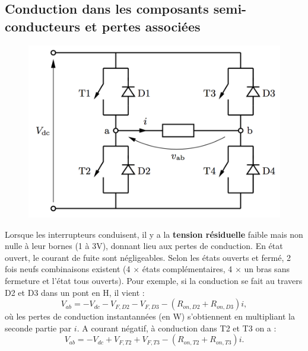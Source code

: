 	\subsection{Conduction dans les composants semi-conducteurs et pertes associées}
		\begin{figure}
		\vspace{-5mm}
		\includegraphics[scale=0.3]{ch4/9}
		\end{figure}
		Lorsque les interrupteurs conduisent, il y a la \textbf{tension résiduelle} faible mais non nulle à leur bornes (1 à 3V), donnant lieu aux pertes de conduction. En état ouvert, le courant de fuite sont négligeables. Selon les états ouverts et fermé, 2 fois neufs combinaisons existent (4 $\times$ états complémentaires, 4 $\times$ un bras sans fermeture et l'état tous ouverts). Pour exemple, si la conduction se fait au travers D2 et D3 dans un pont en H, il vient :
		\begin{equation}
			V_{ab} = -V_{dc}-V_{F,D2}-V_{F,D3}-(R_{on,D2}+R_{on,D3})i,
		\end{equation}
		où les pertes de conduction instantannées (en W) s'obtiennent en multipliant la seconde partie par $i$. A courant négatif, à conduction dans T2 et T3 on a :
		\begin{equation}
			V_{ab} = -V_{dc}+V_{F,T2}+V_{F,T3}-(R_{on,T2}+R_{on,T3})i. 
		\end{equation}
		
